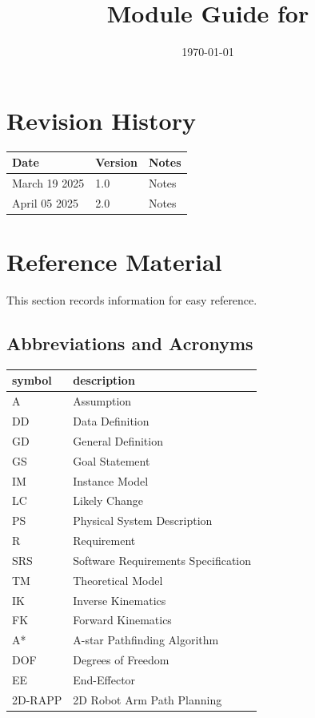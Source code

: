 \documentclass[12pt, titlepage]{article}
\begin{document}
\title{Module Guide for \progname{}} 
\author{\authname}
\date{\today}

\maketitle


\section{Revision History}

\begin{tabularx}{\textwidth}{p{3cm}p{2cm}X}
\toprule {\bf Date} & {\bf Version} & {\bf Notes}\\
\midrule
March 19 2025 & 1.0 & Notes\\
April 05 2025 & 2.0 & Notes\\
\bottomrule
\end{tabularx}

\newpage

\section{Reference Material}

This section records information for easy reference.

\subsection{Abbreviations and Acronyms}

\renewcommand{\arraystretch}{1.2}
\begin{tabular}{l l} 
  \toprule		
  \textbf{symbol} & \textbf{description}\\
  \midrule 
  A & Assumption\\
  DD & Data Definition\\
  GD & General Definition\\
  GS & Goal Statement\\
  IM & Instance Model\\
  LC & Likely Change\\
  PS & Physical System Description\\
  R & Requirement\\
  SRS & Software Requirements Specification\\
  TM & Theoretical Model\\
  IK & Inverse Kinematics \\
  FK & Forward Kinematics \\
  A* & A-star Pathfinding Algorithm \\
  DOF & Degrees of Freedom \\
  EE & End-Effector \\
  2D-RAPP & 2D Robot Arm Path Planning\\
  \bottomrule
\end{tabular}\\
\end{document}
